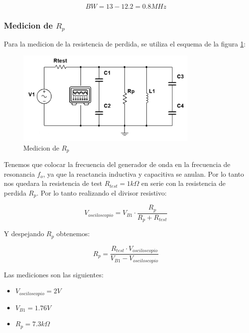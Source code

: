 \begin{equation}
    BW = 13 - 12.2 = 0.8 MHz
\end{equation}

\subsubsection{Medicion de $R_p$}

Para la medicion de la resistencia de perdida, se utiliza el esquema de la figura \ref{fig: de la medicion de la resistencia de perdida}:

\begin{figure}[h]
    \centering
    \includegraphics[width=0.8\textwidth]{Imagenes/medicion_rp.png}
    \caption{Medicion de $R_p$}
    \label{fig: de la medicion de la resistencia de perdida}
\end{figure}

Tenemos que colocar la frecuencia del generador de onda en la frecuencia de resonancia $f_o$, ya que la reactancia inductiva y capacitiva se anulan.
Por lo tanto nos quedara la resistencia de test $R_{test} = 1k\Omega$ en serie con la resistencia de perdida $R_p$. Por lo tanto realizando el divisor resistivo:

\begin{equation}
    V_{osciloscopio} = V_{B1} \cdot \frac{R_p}{R_p + R_{test}}
\end{equation}

Y despejando $R_p$ obtenemos:

\begin{equation}
    R_p = \frac{R_{test} \cdot V_{osciloscopio}}{V_{B1} - V_{osciloscopio}}
\end{equation}

Las mediciones son las siguientes:
\begin{itemize}
    \item $V_{osciloscopio} = 2 V$
    \item $V_{B1} = 1.76 V$
    \item $R_p = 7.3 k\Omega$
\end{itemize}

